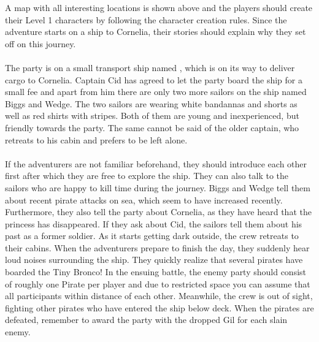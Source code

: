 A map with all interesting locations is shown above and the players should create their Level 1 characters by following the character creation rules.
Since the adventure starts on a ship to Cornelia, their stories should explain why they set off on this journey.
%
\ofpar
%
\\\\
%
The party is on a small transport ship named , which is on its way to deliver cargo to Cornelia.
Captain Cid has agreed to let the party board the ship for a small fee and apart from him there are only two more sailors on the ship named Biggs and Wedge.
The two sailors are wearing white bandannas and shorts as well as red shirts with stripes. 
Both of them are young and inexperienced, but friendly towards the party.
The same cannot be said of the older captain, who retreats to his cabin and prefers to be left alone.
%
\ofpar
%
\\\\
%
If the adventurers are not familiar beforehand, they should introduce each other first after which they are free to explore the ship.
They can also talk to the sailors who are happy to kill time during the journey.
Biggs and Wedge tell them about recent pirate attacks on sea, which seem to have increased recently.
Furthermore, they also tell the party about Cornelia, as they have heard that the princess has disappeared.
If they ask about Cid, the sailors tell them about his past as a former soldier. 
As it starts getting dark outside, the crew retreats to their cabins.
When the adventurers prepare to finish the day, they suddenly hear loud noises surrounding the ship.
They quickly realize that several pirates have boarded the Tiny Bronco!
In the ensuing battle, the enemy party should consist of roughly one Pirate per player and due to restricted space 
you can assume that all participants within distance of each other.
Meanwhile, the crew is out of sight, fighting other pirates who have entered the ship below deck.
When the pirates are defeated, remember to award the party with the dropped Gil for each slain enemy.
%
\vfill
%
